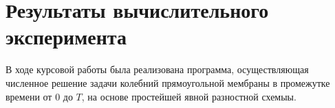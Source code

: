 {{%
%			
%			
%			
%			
%			
			
			
			
	\newpage
	}
	

	\section{Результаты вычислительного эксперимента}{
		В ходе курсовой работы была реализована программа, осуществляющая численное решение задачи колебний прямоугольной мембраны в промежутке времени от $0$ до $T$, на основе простейшей явной разностной схемыы.
		 
}}

